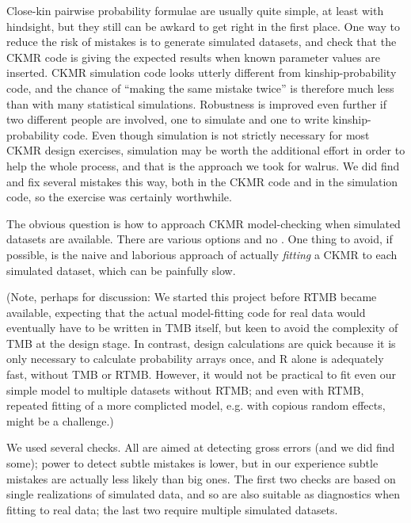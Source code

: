 Close-kin pairwise probability formulae are usually quite simple,
at least with hindsight, but they still can be awkard to get right
in the first place. One way to reduce the risk of mistakes is to generate
simulated datasets, and check that the CKMR code is giving the expected
results when known parameter values are inserted. CKMR simulation
code looks utterly different from kinship-probability code, and the
chance of ``making the same mistake twice'' is therefore much less
than with many statistical simulations. Robustness is improved even
further if two different people are involved, one to simulate and
one to write kinship-probability code. Even though simulation is not
strictly necessary for most CKMR design exercises, simulation may
be worth the additional effort in order to help the whole process,
and that is the approach we took for walrus. We did find and fix several
mistakes this way, both in the CKMR code and in the simulation code,
so the exercise was certainly worthwhile.

The obvious question is how to approach CKMR model-checking when simulated
datasets are available. There are various options and no . One thing
to avoid, if possible, is the naive and laborious approach of actually
\emph{fitting} a CKMR to each simulated dataset, which can be painfully
slow. %
\begin{lyxgreyedout}
(Note, perhaps for discussion: We started this project before RTMB
became available, expecting that the actual model-fitting code for
real data would eventually have to be written in TMB itself, but keen
to avoid the complexity of TMB at the design stage. In contrast, design
calculations are quick because it is only necessary to calculate probability
arrays once, and R alone is adequately fast, without TMB or RTMB.
However, it would not be practical to fit even our simple model to
multiple datasets without RTMB; and even with RTMB, repeated fitting
of a more complicted model, e.g. with copious random effects, might
be a challenge.)%
\end{lyxgreyedout}
{} We used several checks. All are aimed at detecting gross errors (and
we did find some); power to detect subtle mistakes is lower, but in
our experience subtle mistakes are actually less likely than big ones.
The first two checks are based on single realizations of simulated
data, and so are also suitable as diagnostics when fitting to real
data; the last two require multiple simulated datasets.

\begin{comment}
One option is to include final result(s) for each check right here,
after describing the check. Otherwise, if this section goes mainly
into Methods, the results of each little check will be a long way
from the text describing it, and the reader will have forgotten what
the check is by the time they see its results. I absolutely hate papers
like that :) But, it might depend; needs Zoom.
\end{comment}

